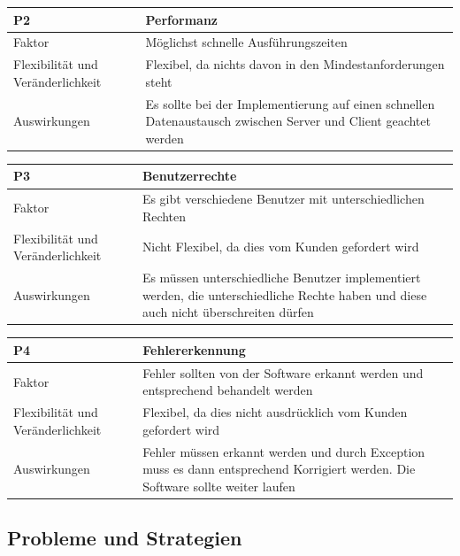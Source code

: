 \documentclass[fontsize=12pt,paper=a4,twoside]{scrartcl}
\begin{document}
\begin{table}[H]
\begin{tabular}{|p{3cm}|p{12cm}|}\hline
P2 &  Performanz\\ \hline
Faktor & Möglichst schnelle Ausführungszeiten\\ \hline
Flexibilität und Veränderlichkeit & Flexibel, da nichts davon in den Mindestanforderungen steht\\ \hline
Auswirkungen & Es sollte bei der Implementierung auf einen schnellen Datenaustausch zwischen Server und Client geachtet werden \\ \hline
\end{tabular}
\end{table}

\begin{table}[H]
\begin{tabular}{|p{3cm}|p{12cm}|}\hline
P3 &  Benutzerrechte \\ \hline
Faktor & Es gibt verschiedene Benutzer mit unterschiedlichen Rechten\\ \hline
Flexibilität und Veränderlichkeit & Nicht Flexibel, da dies vom Kunden gefordert wird\\ \hline
Auswirkungen & Es müssen unterschiedliche Benutzer implementiert werden, die unterschiedliche Rechte haben und diese auch nicht überschreiten dürfen \\ \hline
\end{tabular}
\end{table}

\begin{table}[H]
\begin{tabular}{|p{3cm}|p{12cm}|}\hline
P4 &  Fehlererkennung \\ \hline
Faktor & Fehler sollten von der Software erkannt werden und entsprechend behandelt werden\\ \hline
Flexibilität und Veränderlichkeit & Flexibel, da dies nicht ausdrücklich vom Kunden gefordert wird\\ \hline
Auswirkungen & Fehler müssen erkannt werden und durch Exception muss es dann entsprechend Korrigiert werden. Die Software sollte weiter laufen  \\ \hline
\end{tabular}
\end{table}


\subsection{Probleme und Strategien}
\label{sec:strategien}
\end{document}
